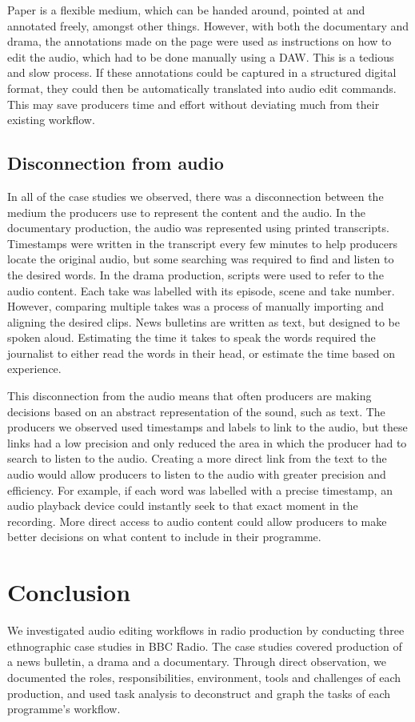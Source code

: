 Paper is a flexible medium, which can be handed around, pointed at and annotated freely, amongst other things.
However, with both the documentary and drama, the annotations made on the page were used as instructions on how to edit
the audio, which had to be done manually using a DAW. This is a tedious and slow process. If these annotations could be
captured in a structured digital format, they could then be automatically translated into audio edit commands. This may
save producers time and effort without deviating much from their existing workflow.

\subsection{Disconnection from audio}
In all of the case studies we observed, there was a disconnection between the medium the producers use to represent the
content and the audio. In the documentary production, the audio was represented using printed transcripts. Timestamps
were written in the transcript every few minutes to help producers locate the original audio, but some searching was
required to find and listen to the desired words.  In the drama production, scripts were used to refer to the audio
content. Each take was labelled with its episode, scene and take number. However, comparing multiple takes was a
process of manually importing and aligning the desired clips.  News bulletins are written as text, but designed to be
spoken aloud. Estimating the time it takes to speak the words required the journalist to either read the words in their
head, or estimate the time based on experience.

This disconnection from the audio means that often producers are making decisions based on an abstract representation of
the sound, such as text. The producers we observed used timestamps and labels to link to the audio, but
these links had a low precision and only reduced the area in which the producer had to search to listen to the audio.
Creating a more direct link from the text to the audio would allow producers to listen to the audio with greater
precision and efficiency. For example, if each word was labelled with a precise timestamp, an audio playback device
could instantly seek to that exact moment in the recording. More direct access to audio content
could allow producers to make better decisions on what content to include in their programme.

\section{Conclusion}\label{sec:ethno-conclusion}
We investigated audio editing workflows in radio production by conducting three ethnographic case studies in BBC
Radio. The case studies covered production of a news bulletin, a drama and a documentary.  Through direct observation,
we documented the roles, responsibilities, environment, tools and challenges of each production, and used task analysis
to deconstruct and graph the tasks of each programme's workflow.

